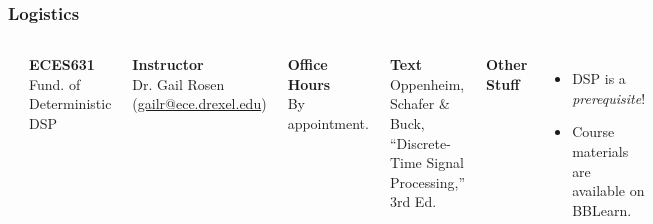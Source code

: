 \documentclass[mathserif,9pt,handout]{beamer}
\begin{document}
\begin{frame}\frametitle{Logistics}\small
  \begin{columns}
      \begin{center}\includegraphics[width=.8\textwidth]{dtsp.jpg}\end{center}
    {\bf\color{blue!50!black}ECES631} \\
    Fund. of Deterministic DSP \\
    \vspace{1em}
    
    {\bf\color{blue!50!black}Instructor} \\
    Dr. Gail Rosen (\url{gailr@ece.drexel.edu}) \\
    \vspace{1em}
    
    {\bf\color{blue!50!black}Office Hours} \\
    By appointment. \\
    \vspace{1em}

    
    {\bf\color{blue!50!black}Text} \\
    Oppenheim, Schafer \& Buck, ``Discrete-Time Signal Processing,'' 3rd Ed.
    \vspace{1em}
    
    {\bf\color{blue!50!black}Other Stuff}
    \begin{itemize}
      \item DSP is a {\em prerequisite}!
      \item Course materials are available on BBLearn.  
    \end{itemize}
    \vspace{1em}
  \end{columns}
\end{frame}
\end{document}
